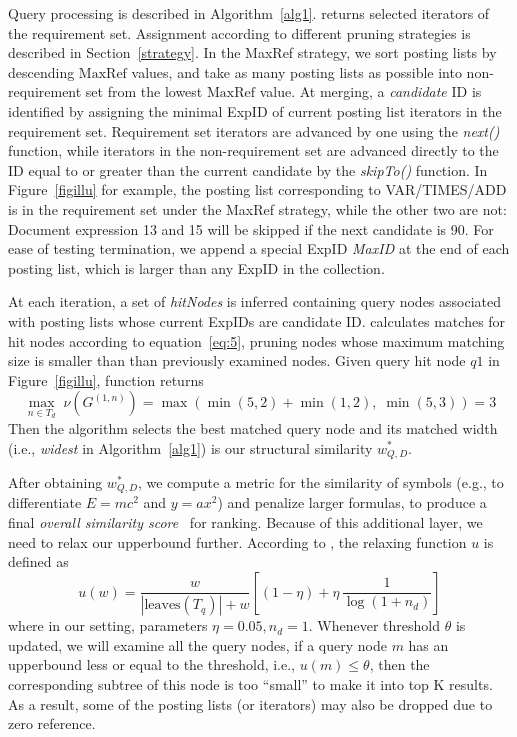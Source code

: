 \documentclass[runningheads]{llncs}
\begin{document}
Query processing is described in Algorithm~\ref{alg1}.
 returns selected iterators of the requirement set.
Assignment according to different pruning strategies is described in Section~\ref{strategy}.
%
In the MaxRef strategy, we sort posting lists by descending $\text{MaxRef}$ values, and take as many posting lists as possible into non-requirement set from the lowest $\text{MaxRef}$ value.
At merging, a \textit{candidate} ID is identified by assigning the minimal ExpID of current posting list iterators in the requirement set.
Requirement set iterators are advanced by one using the \textit{next()} function, while iterators in the non-requirement set are advanced directly to the ID equal to or greater than the current candidate by the \textit{skipTo()} function. In Figure~\ref{figillu} for example, the posting list corresponding to VAR/TIMES/ADD is in the requirement set under the MaxRef strategy, while the other two are not: Document expression 13 and 15 will be skipped if the next candidate is 90.
%
For ease of testing termination, we append a special ExpID \emph{MaxID} at the end of each posting list, which is larger than any ExpID in the collection.

At each iteration, a set of \textit{hitNodes} is inferred containing query nodes associated with posting lists whose current ExpIDs are candidate ID.
 calculates matches for hit nodes according to equation~\ref{eq:5}, pruning nodes whose maximum matching size is smaller than than previously examined nodes.
%
Given query hit node $q1$ in Figure~\ref{figillu}, function  returns
$$\max_{n\in T_d}\;\nu(G^{(1, n)}) = \max(\min(5, 2) + \min(1, 2),\; \min(5, 3)) = 3$$
Then the algorithm selects the best matched query node and its matched width (i.e., \emph{widest} in Algorithm~\ref{alg1}) is our structural similarity $w^*_{Q, D}$.

After obtaining $w^*_{Q, D}$, we compute a metric for the similarity of symbols (e.g., to differentiate $E=mc^2$ and $y=ax^2$) and penalize larger formulas, to produce a final \emph{overall similarity score}~\cite{a0_2019} for ranking.
Because of this additional layer, we need to relax our upperbound further.
According to \cite{a0_2019}, the relaxing function $u$ is defined as
\begin{equation}
u(w) = \frac{w}{|\text{leaves}(T_q)| + w} \left[ (1 - \eta) + \eta \, \frac 1 {\log (1 + n_d)} \right]
\end{equation}
where in our setting,  parameters $\eta = 0.05, n_d = 1$.
%
Whenever threshold $\theta$ is updated, we will examine all the query nodes, if a query node $m$ has an upperbound less or equal to the threshold, i.e., $u(m) \le \theta$, then the corresponding subtree of this node is too ``small'' to make it into top K results. As a result, some of the posting lists (or iterators) may also be dropped due to zero reference.
\end{document}
